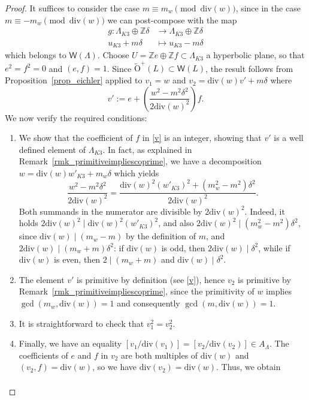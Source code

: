\documentclass[12pt,a4paper]{amsart}
\theoremstyle{plain}
\theoremstyle{definition}
\theoremstyle{remark}
\newcommand{\ZZ}{\mathbb{Z}}
\newcommand{\W}{\mathsf{W}}
\newcommand{\Lambdan}{{\Lambda}}
\begin{document}
\begin{proof}
    It suffices to consider the case $m \equiv m_w \pmod{\mathrm{div}(w)}$, since in the case $m \equiv -m_w \pmod{\mathrm{div}(w)}$ we can post-compose with the map
    \begin{align*}
        g\colon \Lambda_{K3}\oplus\mathbb{Z}\delta &\longrightarrow \Lambda_{K3}\oplus\mathbb{Z}\delta \\
            u_{K3}+m\delta &\longmapsto u_{K3}-m\delta
    \end{align*}
    which belongs to $\W(\Lambdan)$. Choose $U=\ZZ e\oplus \ZZ f\subset\Lambda_{K3}$ a hyperbolic plane, so that $e^2=f^2=0$ and $        (e,f)=1$. 
    Since $\widetilde{\mathrm{O}}^{+}(L)\subset\mathsf{W}(L)$, the result follows from Proposition~\ref{prop_eichler} applied to $v_1=w$ and $v_2=\mathrm{div}(w)v' + m\delta$ where
    \begin{equation}\label{v}
        v':=e+\left(\frac{w^2-m^2\delta^2}{2\mathrm{div}(w)^2}\right)f.
    \end{equation}
    We now verify the required conditions:
    \begin{enumerate}
        \item We show that the coefficient of $f$ in \eqref{v} is an integer, showing that $v'$ is a well defined element of $\Lambda_{K3}$. In fact, as explained in Remark~\ref{rmk_primitiveimpliescoprime}, we have a decomposition $w=\mathrm{div}(w)w'_{K3}+m_w\delta$ which yields
        \[
            \frac{w^2-m^2\delta^2}{2\mathrm{div}(w)^2}=\frac{\mathrm{div}(w)^2(w'_{K3})^2+(m_w^2-m^2)\delta^2}{2\mathrm{div}(w)^2}.
        \]
        Both summands in the numerator are divisible by $2\mathrm{div}(w)^2$. Indeed, it holds $2\mathrm{div}(w)^2 \mid \mathrm{div}(w)^2 (w'_{K3})^2$, and also $2\mathrm{div}(w)^2 \mid (m_w^2 - m^2)\delta^2$, since $\mathrm{div}(w) \mid (m_w - m)$ by the definition of $m$, and $2\mathrm{div}(w) \mid (m_w + m)\delta^2$: if $\mathrm{div}(w)$ is odd, then $2\mathrm{div}(w) \mid \delta^2$, while if $\mathrm{div}(w)$ is even, then $2 \mid (m_w + m)$ and $\mathrm{div}(w) \mid \delta^2$.
            \item The element $v'$ is primitive by definition (see \eqref{v}), hence $v_2$ is primitive by Remark~\ref{rmk_primitiveimpliescoprime}, since the primitivity of $w$ implies $\gcd(m_w,\mathrm{div}(w)) = 1$ and consequently $\gcd(m,\mathrm{div}(w)) = 1$.
            \item It is straightforward to check that $v_1^2 = v_2^2$.
            \item Finally, we have an equality $[v_1/\mathrm{div}(v_1)]=[v_2/\mathrm{div}(v_2)]\in A_\Lambdan$. The coefficients of $e$ and $f$ in $v_2$ are both multiples of $\mathrm{div}(w)$ and $(v_2,f)=\mathrm{div}(w)$, so we have $\mathrm{div}(v_2)=\mathrm{div}(w)$. Thus, we obtain \begin{align*}

\end{align*}
\end{enumerate}
\end{proof}
\end{document}

